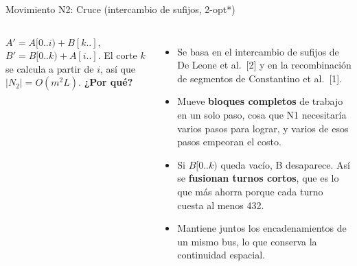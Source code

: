 \documentclass[aspectratio=169,10pt]{beamer}
\begin{document}
\begin{frame}{Movimiento N2: Cruce (intercambio de sufijos, 2-opt*)}
\begin{columns}[T]

\small $A'=A[0..i)+B[k..]$, $B'=B[0..k)+A[i..]$. El corte $k$ se calcula a partir de $i$, así que $|N_2|=O(m^2 L)$.
\textbf{¿Por qué?}
\begin{itemize}
\item Se basa en el intercambio de sufijos de De Leone et al.~[2] y en la recombinación de segmentos de Constantino et al.~[1].
\item Mueve \textbf{bloques completos} de trabajo en un solo paso, cosa que N1 necesitaría varios pasos para lograr, y varios de esos pasos empeoran el costo.
\item Si $B[0..k)$ queda vacío, B desaparece. Así se \textbf{fusionan turnos cortos}, que es lo que más ahorra porque cada turno cuesta al menos 432.
\item Mantiene juntos los encadenamientos de un mismo bus, lo que conserva la continuidad espacial.
\end{itemize}
\end{columns}
\end{frame}
\end{document}
